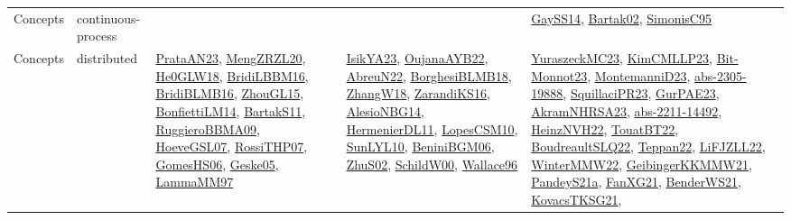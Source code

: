 {\begin{longtable}{lp{3cm}>{\raggedright}p{6cm}>{\raggedright}p{6cm}p{8cm}}
Concepts & continuous-process &  &  & \href{papers/GaySS14.pdf}{GaySS14}\cite{GaySS14}, \href{papers/Bartak02.pdf}{Bartak02}\cite{Bartak02}, \href{papers/SimonisC95.pdf}{SimonisC95}\cite{SimonisC95}\\
Concepts & distributed & \href{articles/PrataAN23.pdf}{PrataAN23}\cite{PrataAN23}, \href{articles/MengZRZL20.pdf}{MengZRZL20}\cite{MengZRZL20}, \href{papers/He0GLW18.pdf}{He0GLW18}\cite{He0GLW18}, \href{papers/BridiLBBM16.pdf}{BridiLBBM16}\cite{BridiLBBM16}, \href{articles/BridiBLMB16.pdf}{BridiBLMB16}\cite{BridiBLMB16}, \href{papers/ZhouGL15.pdf}{ZhouGL15}\cite{ZhouGL15}, \href{papers/BonfiettiLM14.pdf}{BonfiettiLM14}\cite{BonfiettiLM14}, \href{articles/BartakS11.pdf}{BartakS11}\cite{BartakS11}, \href{articles/RuggieroBBMA09.pdf}{RuggieroBBMA09}\cite{RuggieroBBMA09}, \href{papers/HoeveGSL07.pdf}{HoeveGSL07}\cite{HoeveGSL07}, \href{papers/RossiTHP07.pdf}{RossiTHP07}\cite{RossiTHP07}, \href{papers/GomesHS06.pdf}{GomesHS06}\cite{GomesHS06}, \href{papers/Geske05.pdf}{Geske05}\cite{Geske05}, \href{articles/LammaMM97.pdf}{LammaMM97}\cite{LammaMM97} & \href{articles/IsikYA23.pdf}{IsikYA23}\cite{IsikYA23}, \href{papers/OujanaAYB22.pdf}{OujanaAYB22}\cite{OujanaAYB22}, \href{articles/AbreuN22.pdf}{AbreuN22}\cite{AbreuN22}, \href{articles/BorghesiBLMB18.pdf}{BorghesiBLMB18}\cite{BorghesiBLMB18}, \href{articles/ZhangW18.pdf}{ZhangW18}\cite{ZhangW18}, \href{articles/ZarandiKS16.pdf}{ZarandiKS16}\cite{ZarandiKS16}, \href{papers/AlesioNBG14.pdf}{AlesioNBG14}\cite{AlesioNBG14}, \href{papers/HermenierDL11.pdf}{HermenierDL11}\cite{HermenierDL11}, \href{articles/LopesCSM10.pdf}{LopesCSM10}\cite{LopesCSM10}, \href{papers/SunLYL10.pdf}{SunLYL10}\cite{SunLYL10}, \href{papers/BeniniBGM06.pdf}{BeniniBGM06}\cite{BeniniBGM06}, \href{papers/ZhuS02.pdf}{ZhuS02}\cite{ZhuS02}, \href{articles/SchildW00.pdf}{SchildW00}\cite{SchildW00}, \href{articles/Wallace96.pdf}{Wallace96}\cite{Wallace96} & \href{papers/YuraszeckMC23.pdf}{YuraszeckMC23}\cite{YuraszeckMC23}, \href{papers/KimCMLLP23.pdf}{KimCMLLP23}\cite{KimCMLLP23}, \href{papers/Bit-Monnot23.pdf}{Bit-Monnot23}\cite{Bit-Monnot23}, \href{articles/MontemanniD23.pdf}{MontemanniD23}\cite{MontemanniD23}, \href{articles/abs-2305-19888.pdf}{abs-2305-19888}\cite{abs-2305-19888}, \href{papers/SquillaciPR23.pdf}{SquillaciPR23}\cite{SquillaciPR23}, \href{articles/GurPAE23.pdf}{GurPAE23}\cite{GurPAE23}, \href{articles/AkramNHRSA23.pdf}{AkramNHRSA23}\cite{AkramNHRSA23}, \href{articles/abs-2211-14492.pdf}{abs-2211-14492}\cite{abs-2211-14492}, \href{articles/HeinzNVH22.pdf}{HeinzNVH22}\cite{HeinzNVH22}, \href{papers/TouatBT22.pdf}{TouatBT22}\cite{TouatBT22}, \href{papers/BoudreaultSLQ22.pdf}{BoudreaultSLQ22}\cite{BoudreaultSLQ22}, \href{papers/Teppan22.pdf}{Teppan22}\cite{Teppan22}, \href{papers/LiFJZLL22.pdf}{LiFJZLL22}\cite{LiFJZLL22}, \href{papers/WinterMMW22.pdf}{WinterMMW22}\cite{WinterMMW22}, \href{papers/GeibingerKKMMW21.pdf}{GeibingerKKMMW21}\cite{GeibingerKKMMW21}, \href{articles/PandeyS21a.pdf}{PandeyS21a}\cite{PandeyS21a}, \href{articles/FanXG21.pdf}{FanXG21}\cite{FanXG21}, \href{papers/BenderWS21.pdf}{BenderWS21}\cite{BenderWS21}, \href{papers/KovacsTKSG21.pdf}{KovacsTKSG21}\cite{KovacsTKSG21}, 
\end{longtable}}
